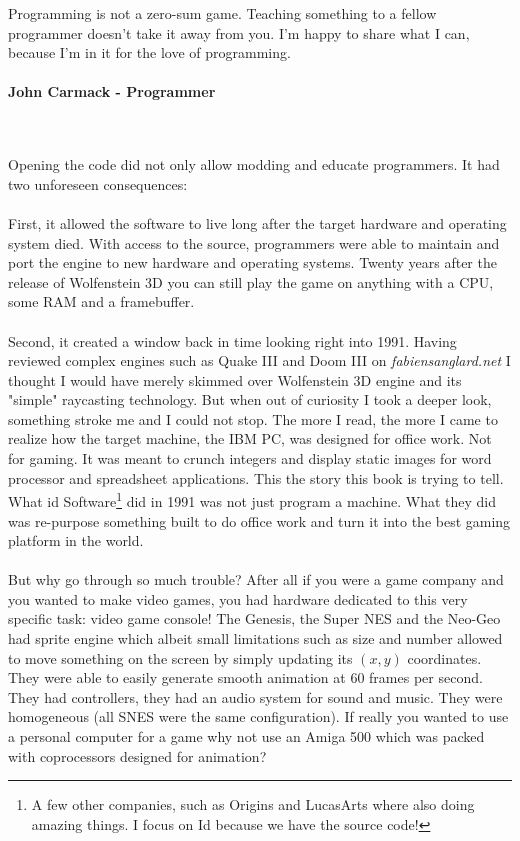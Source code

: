  \begin{fancyquotes}
   Programming is not a zero-sum game. Teaching something to a fellow programmer doesn't take it away from you. I'm happy to share what I can, because I'm in it for the love of programming.\\
   \\
\textbf{John Carmack - Programmer}
 \end{fancyquotes}\\
\\
Opening the code did not only allow modding and educate programmers. It had two unforeseen consequences:\\
\\
First, it allowed the software to live long after the target hardware and operating system died. With access to the source, programmers were able to maintain and port the engine to new hardware and operating systems. Twenty years after the release of Wolfenstein 3D you can still play the game on anything with a CPU, some RAM and a framebuffer. \\
\\
Second, it created a window back in time looking right into 1991. Having reviewed complex engines such as Quake III and Doom III on \emph{fabiensanglard.net} I thought I would have merely skimmed over Wolfenstein 3D engine and its "simple" raycasting technology. But when out of curiosity I took a deeper look, something stroke me and I could not stop. The more I read, the more I came to realize how the target machine, the IBM PC, was designed for office work. Not for gaming. It was meant to crunch integers and display static images for word processor and spreadsheet applications. This the story this book is trying to tell. What id Software\footnote{A few other companies, such as Origins and LucasArts where also doing amazing things. I focus on Id because we have the source code!} did in 1991 was not just program a machine. What they did was re-purpose something built to do office work and turn it into the best gaming platform in the world.\\
\\
But why go through so much trouble? After all if you were a game company and you wanted to make video games, you had hardware dedicated to this very specific task: video game console! The Genesis, the Super NES and the Neo-Geo had sprite engine which albeit small limitations such as size and number allowed to move something on the screen by simply updating its $(x,y)$ coordinates. They were able to easily generate smooth animation at 60 frames per second. They had controllers, they had an audio system for sound and music. They were homogeneous (all SNES were the same configuration). If really you wanted to use a personal computer for a game why not use an Amiga 500 which was packed with coprocessors designed for animation?\\
